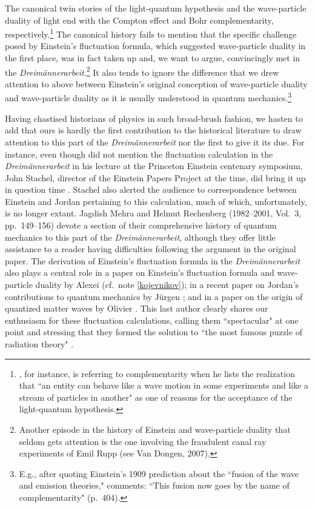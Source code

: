 \documentclass[12pt]{elsart}
\begin{document}
The canonical twin stories of the light-quantum hypothesis and the wave-particle duality of light end with the Compton effect and Bohr complementarity, respectively.\footnote{\citet[p.\ 237]{Brush 2007}, for instance, is referring to complementarity when he lists the realization that ``an entity can behave like a wave motion in some experiments and like a stream of particles in another" as one of reasons for the acceptance of the light-quantum hypothesis.} The canonical history fails to mention that the specific challenge posed by Einstein's fluctuation formula, which suggested wave-particle duality in the first place, was in fact taken up and, we want to argue, convincingly met in the {\it Dreim\"annerarbeit}.\footnote{Another episode in the history of Einstein and wave-particle duality that seldom gets attention is the one involving the fraudulent canal ray experiments of Emil Rupp (see Van Dongen, 2007).}  It also tends to ignore the difference that we drew attention to above between Einstein's original conception of wave-particle duality and wave-particle duality as it is usually understood in quantum mechanics.\footnote{\label{pais}E.g., after quoting Einstein's 1909 prediction about the ``fusion of the wave and emission theories," \citet{Pais 1982} comments: ``This fusion now goes by the name of complementarity" (p.\ 404).} 

Having chastised historians of physics in such broad-brush fashion, we hasten to add that ours is hardly the first contribution to the historical literature to draw attention to this part of the {\it Dreim\"annerarbeit} nor the first to give it its due. For instance, even though \citet{Klein 1980} did not mention the fluctuation calculation in the {\it Dreim\"annerarbeit} in his lecture at the Princeton Einstein centenary symposium, John Stachel, director of the Einstein Papers Project at the time, did bring it up in question time \citep[p.\ 196]{Woolf 1980}. Stachel also alerted the audience to  correspondence between Einstein and Jordan pertaining to this calculation, much of which, unfortunately, is no longer extant. Jagdish Mehra and Helmut Rechenberg (1982--2001, Vol.\ 3, pp.\ 149--156) devote a section of their comprehensive history of quantum mechanics to this part of the {\it Dreim\"annerarbeit}, although they offer little assistance to a reader having difficulties following the argument in the original paper. The derivation of Einstein's fluctuation formula in the  {\it Dreim\"annerarbeit} also plays a central role in a paper on Einstein's fluctuation formula and wave-particle duality by Alexei \citet{Kojevnikov 1990} (cf.\ note \ref{kojevnikov}); in a recent paper on Jordan's contributions to quantum mechanics by J\"urgen \citet{Ehlers 2007}; and in a paper on the origin of quantized matter waves by Olivier \citet{Darrigol 1986}. This last author clearly shares our enthusiasm for these fluctuation calculations, calling them ``spectacular" at one point and stressing that they formed the solution to ``the most famous puzzle of radiation theory" \citep[p.\ 221--222]{Darrigol 1986}. 
\end{document}
